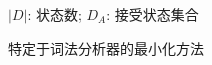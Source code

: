 \begin{frame}{}

  \begin{center}
    $|D|$: 状态数; \qquad $D_{A}$: 接受状态集合
  \end{center}
\end{frame}

\begin{frame}{}

  \vspace{0.30cm}
  \begin{center}
  \end{center}
\end{frame}

\begin{frame}{}
  \begin{center}
    特定于词法分析器的最小化方法
  \end{center}
\end{frame}
